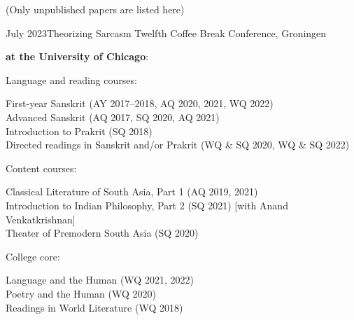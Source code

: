 \documentclass{scrartcl}
\begin{document}
\sectionline

(Only unpublished papers are listed here)
\begin{entrylist}
{July 2023}{Theorizing Sarcasm}
{Twelfth Coffee Break Conference, Groningen}
\end{entrylist}

\sectionline


\textbf{at the University of Chicago}:\vspace{1ex}

\quad\begin{minipage}{0.9\textwidth}
Language and reading courses:\vspace{1ex}

\quad\begin{minipage}{0.9\textwidth}
First-year Sanskrit (AY 2017–2018, AQ 2020, 2021, WQ 2022)\\[.5ex]
Advanced Sanskrit (AQ 2017, SQ 2020, AQ 2021)\\[.5ex]
Introduction to Prakrit (SQ 2018)\\[.5ex]
Directed readings in Sanskrit and/or Prakrit (WQ \& SQ 2020, WQ \& SQ 2022)\\
\end{minipage}
\end{minipage}\vspace{-.75ex}

\quad\begin{minipage}{0.9\textwidth}
Content courses:\vspace{1ex}

\quad\begin{minipage}{0.9\textwidth}
Classical Literature of South Asia, Part 1 (AQ 2019, 2021)\\[.5ex]
Introduction to Indian Philosophy, Part 2 (SQ 2021) [with Anand Venkatkrishnan]\\[.5ex]
Theater of Premodern South Asia (SQ 2020)
\end{minipage}
\end{minipage}\medskip

\quad\begin{minipage}{0.9\textwidth}
College core:\vspace{1ex}

\quad\begin{minipage}{0.9\textwidth}
Language and the Human (WQ 2021, 2022)\\[.5ex]
Poetry and the Human (WQ 2020)\\[.5ex]
Readings in World Literature (WQ 2018)
\end{minipage}
\end{minipage}\medskip\medskip
\end{document}
